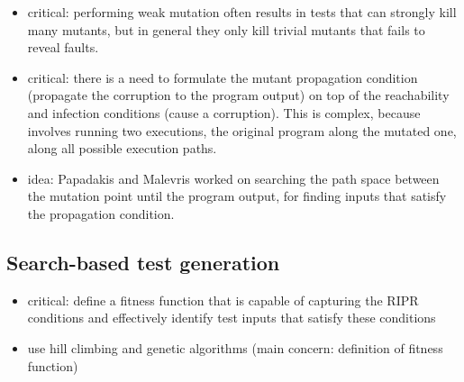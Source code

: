 \begin{itemize}
	\item critical: performing weak mutation often results in tests that can strongly kill many mutants, but in general they only kill trivial mutants that fails to reveal faults.
	
	\item critical: there is a need to formulate the mutant propagation condition (propagate the corruption to the program output) on top of the reachability and infection conditions (cause a corruption). This is complex, because involves running two executions, the original program along the mutated one, along all possible execution paths.

	\item idea: Papadakis and Malevris \cite{papadakis2010automatic} worked on searching the path space between the mutation point until the program output, for finding inputs that satisfy the propagation condition.  

\end{itemize}

\subsection{Search-based test generation} %
\label{sub:search_based_test_generation}

\begin{itemize}
	\item critical: define a fitness function that is capable of capturing the RIPR conditions and effectively identify test inputs that satisfy these conditions
	\item use hill climbing and genetic algorithms (main concern: definition of fitness function) 
\end{itemize}


